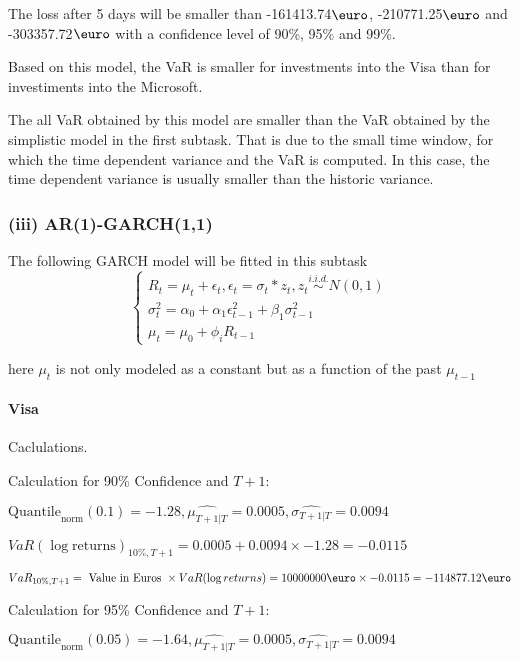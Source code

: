 The loss after 5 days will be smaller than -161413.74$\text{\euro}$, -210771.25$\text{\euro}$  and -303357.72$\text{\euro}$  with a confidence level of 90\%, 95\%  and 99\%.

Based on this model, the VaR is smaller for investments into the Visa than for investiments into the Microsoft.

The all VaR obtained by this model are smaller than the VaR obtained by the simplistic model in the first subtask. That is due to the small time window, for which the time dependent variance and the VaR is computed. In this case, the time dependent variance is usually smaller than the historic variance.

\subsubsection{(iii) AR(1)-GARCH(1,1)}
The following GARCH model will be fitted in this subtask
$$\begin{cases} R_t = \mu_t + \epsilon_t, \epsilon_t = \sigma_t  * z_t, z_t \overset{i.i.d.}{\sim} N(0,1) \\ \sigma^2_t = \alpha_0 + \alpha_1 \epsilon^2_{t-1} + \beta_1 \sigma^2_{t-1} \\ \mu_t = \mu_0 + \phi_i R_{t-1} \end{cases}$$ 


here $\mu_t$ is not only modeled as a constant but as a function of the past $\mu_{t-1}$
\paragraph{Visa} Caclulations.\newline \indent 




Calculation for 90\% Confidence and $T+1$:

\indent\indent $\text{Quantile}_\text{norm}(0.1) = -1.28,\hat{\mu_{T+1|T}} = 0.0005, \hat{\sigma_{T+1|T}} = 0.0094$

\indent\indent $VaR(\log \text{returns})_{10\%, T + 1} = 0.0005 + 0.0094\times-1.28 = -0.0115$

\indent\indent $VaR_{10\%, T + 1} = \text{ Value in Euros } \times VaR(\log returns) = 10 000 000 \text{\euro} \times-0.0115 = -114877.12 \text{\euro}$\newline




Calculation for 95\% Confidence and $T+1$:

\indent\indent $\text{Quantile}_\text{norm}(0.05) = -1.64,\hat{\mu_{T+1|T}} = 0.0005, \hat{\sigma_{T+1|T}} = 0.0094$

